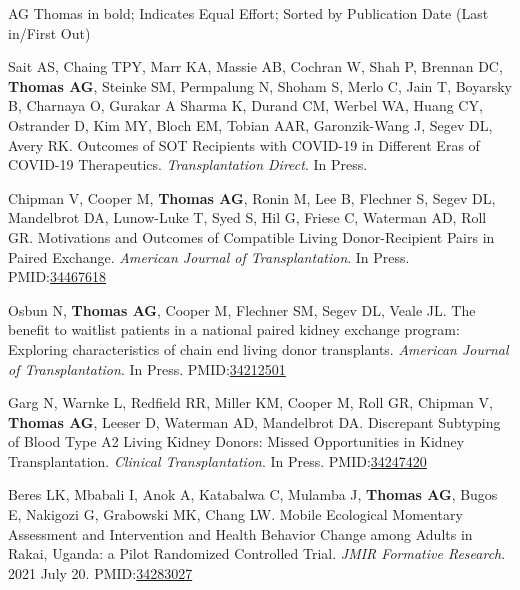 \documentclass[10pt]{article}
\makeatletter
\newlength{\bibhang}
\newlength{\bibsep}
 {\@listi \global\bibsep\itemsep \global\advance\bibsep by\parsep}
\newenvironment{bibenum*}
  {\renewcommand\labelenumi{[\theenumi]}%
   \etaremune[
     topsep=0pt,
     itemsep=\bibsep,
     parsep=0pt,partopsep=0pt,
     itemindent=-\bibhang,
     leftmargin={\bibhang+\widthof{[999]}}]}
  {\endetaremune}
\newcommand{\pmid}[1]{PMID:\href{https://www.ncbi.nlm.nih.gov/pubmed/#1}{#1}}
\makeatother
\begin{document}
  AG Thomas in bold; \textbf{\dag} Indicates Equal Effort;
  Sorted by Publication Date (Last in/First Out)

\vspace{2mm}

\begin{bibenum*}

\item Sait AS, Chaing TPY, Marr KA, Massie AB, Cochran W, 
  Shah P, Brennan DC, \textbf{Thomas AG}, Steinke SM, 
  Permpalung N, Shoham S, Merlo C, Jain T, Boyarsky B, 
  Charnaya O, Gurakar A Sharma K, Durand CM, Werbel WA,
  Huang CY, Ostrander D, Kim MY, Bloch EM, Tobian AAR,
  Garonzik-Wang J, Segev DL, Avery RK.
  Outcomes of SOT Recipients with COVID-19 in 
  Different Eras of COVID-19 Therapeutics.
  \emph{Transplantation Direct}. In Press.

\item Chipman V, Cooper M, \textbf{Thomas AG}, Ronin M,
  Lee B, Flechner S, Segev DL, Mandelbrot DA, Lunow-Luke T,
  Syed S, Hil G, Friese C, Waterman AD, Roll GR.
  Motivations and Outcomes of Compatible Living 
  Donor-Recipient Pairs in Paired Exchange.
  \emph{American Journal of Transplantation}. In Press.
  \pmid{34467618} 

\item Osbun N, \textbf{Thomas AG}, Cooper M, Flechner SM,
  Segev DL, Veale JL.
  The benefit to waitlist patients in a national paired kidney 
  exchange program: Exploring characteristics of chain end 
  living donor transplants.
  \emph{American Journal of Transplantation}. In Press.
  \pmid{34212501} 

\item Garg N, Warnke L, Redfield RR, Miller KM, Cooper M, Roll GR,
  Chipman V, \textbf{Thomas AG}, Leeser D, Waterman AD, 
  Mandelbrot DA. 
  Discrepant Subtyping of Blood Type A2 Living Kidney Donors: 
  Missed Opportunities in Kidney Transplantation.
  \emph{Clinical Transplantation}. In Press.
  \pmid{34247420} 

\item Beres LK, Mbabali I, Anok A, Katabalwa C,
  Mulamba J, \textbf{Thomas AG}, Bugos E, Nakigozi G,
  Grabowski MK, Chang LW.
  Mobile Ecological Momentary Assessment and Intervention 
  and Health Behavior Change among Adults in Rakai, 
  Uganda: a Pilot Randomized Controlled Trial.
  \emph{JMIR Formative Research}. 2021 July 20.
  \pmid{34283027} 


\end{bibenum*}
\end{document}
